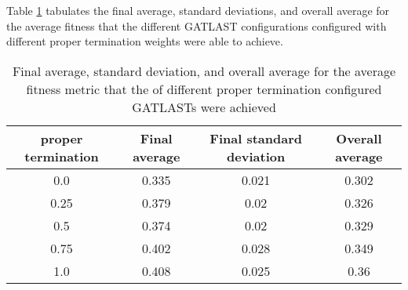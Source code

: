 Table \ref{tab:HP:GA:Livelyness:average fitness} tabulates the final average, standard deviations, and overall average for the average fitness that the different GATLAST configurations configured with different proper termination weights were able to achieve.
\begin{table}[tbh!]
\centering
\begin{adjustbox}{trim=0cm 0cm 0cm 0cm, clip=true}
\begin{tabular}{|c|c|c|c|}
\hline
proper termination & Final average & Final standard deviation & Overall average\\
\hline
0.0 & 0.335 & 0.021 & 0.302\\\hline
0.25 & 0.379 & 0.02 & 0.326\\\hline
0.5 & 0.374 & 0.02 & 0.329\\\hline
0.75 & 0.402 & 0.028 & 0.349\\\hline
1.0 & 0.408 & 0.025 & 0.36\\\hline
\end{tabular}
\end{adjustbox}
\caption{Final average, standard deviation, and overall average for the average fitness metric that the of different proper termination configured GATLASTs were achieved}
\label{tab:HP:GA:Livelyness:average fitness}
\end{table}